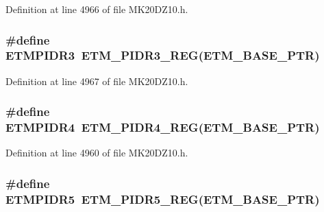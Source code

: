 Definition at line 4966 of file M\+K20\+D\+Z10.\+h.

\subsubsection[{\texorpdfstring{E\+T\+M\+P\+I\+D\+R3}{ETMPIDR3}}]{\setlength{\rightskip}{0pt plus 5cm}\#define E\+T\+M\+P\+I\+D\+R3~{\bf E\+T\+M\+\_\+\+P\+I\+D\+R3\+\_\+\+R\+EG}({\bf E\+T\+M\+\_\+\+B\+A\+S\+E\+\_\+\+P\+TR})}\hypertarget{group___e_t_m___register___accessor___macros_gae9907a316418f803c7b705d546359c7f}{}\label{group___e_t_m___register___accessor___macros_gae9907a316418f803c7b705d546359c7f}


Definition at line 4967 of file M\+K20\+D\+Z10.\+h.

\subsubsection[{\texorpdfstring{E\+T\+M\+P\+I\+D\+R4}{ETMPIDR4}}]{\setlength{\rightskip}{0pt plus 5cm}\#define E\+T\+M\+P\+I\+D\+R4~{\bf E\+T\+M\+\_\+\+P\+I\+D\+R4\+\_\+\+R\+EG}({\bf E\+T\+M\+\_\+\+B\+A\+S\+E\+\_\+\+P\+TR})}\hypertarget{group___e_t_m___register___accessor___macros_ga5b57f3576bd37158c3c4baaeaf84e6e7}{}\label{group___e_t_m___register___accessor___macros_ga5b57f3576bd37158c3c4baaeaf84e6e7}


Definition at line 4960 of file M\+K20\+D\+Z10.\+h.

\subsubsection[{\texorpdfstring{E\+T\+M\+P\+I\+D\+R5}{ETMPIDR5}}]{\setlength{\rightskip}{0pt plus 5cm}\#define E\+T\+M\+P\+I\+D\+R5~{\bf E\+T\+M\+\_\+\+P\+I\+D\+R5\+\_\+\+R\+EG}({\bf E\+T\+M\+\_\+\+B\+A\+S\+E\+\_\+\+P\+TR})}\hypertarget{group___e_t_m___register___accessor___macros_ga71c1eb4106e4301306333e0baadc3c50}{}\label{group___e_t_m___register___accessor___macros_ga71c1eb4106e4301306333e0baadc3c50}



